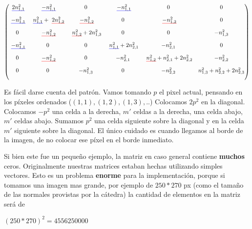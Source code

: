 \setul{5pt}{2pt}
\[
\begin{pmatrix}
    \text{\setulcolor{blue} \ul{$2 n_{1,1}^{2}$}}  &  \text{\setulcolor{blue} \ul{$ -n_{1,1}^{2} $}}   &  0        & \text{\setulcolor{blue} \ul{$-n_{1,1}^{2} $}}   & 0         & 0            \\[10pt]

    \text{\setulcolor{blue} \ul{$-n_{1,1}^{2}$}} &  \text{\setulcolor{blue} \ul{$n_{1,1}^{2}$}} +                                \text{\setulcolor{red} \ul{$2 n_{1,2}^{2}$}}   &  \text{\setulcolor{red} \ul{$-n_{1,2}^{2}$}}        & 0     & \text{\setulcolor{red} \ul{$-n_{1,2}^{2}$}}         & 0            \\[10pt]

    0          &  \text{\setulcolor{red} \ul{$-n_{1,2}^{2}$}}  &  \text{\setulcolor{red} \ul{$n_{1,2}^{2}$}} + 2 n_{1,3}^{2} &   0   & 0  & -n_{1,3}^{2}            \\[10pt]

    \text{\setulcolor{blue} \ul{$-n_{1,1}^{2}$}} &  0            &  0           & \text{\setulcolor{blue} \ul{$n_{1,1}^{2}$}} + 2 n_{2,1}^{2} & -n_{2,1}^{2}    & 0            \\[10pt]

    0          &   \text{\setulcolor{red} \ul{$-n_{1,2}^{2}$}} & 0           & -n_{2,1}^{2}                & \text{\setulcolor{red} \ul{$n_{1,2}^{2}$}} + n_{2,1}^{2} + 2 n_{2,2}^{2}    &      -n_{2,2}^{2}  \\[10pt]

    0          &              0&  -n_{1,3}^{2} & 0                          & - n_{2,2}^{2} & n_{1,3}^{2} + n_{2,2}^{2} + 2 n_{2,3}^{2}             \\[10pt]

\end{pmatrix}
\]

Es fácil darse cuenta del patrón. Vamos tomando $p$ el pixel actual, pensando en los píxeles ordenados ($(1,1), (1,2), (1,3), .. $) Colocamos $2p^2$ en la diagonal. Colocamos $-p^2$ una celda a la derecha, $m'$ celdas a la derecha, una celda abajo, $m'$ celdas abajo. Sumamos $p^2$ una celda siguiente sobre la diagonal y en la celda $m'$ siguiente sobre la diagonal. El único cuidado es cuando llegamos al borde de la imagen, de no colocar ese píxel en el borde inmediato.

Si bien este fue un pequeño ejemplo, la matriz en caso general contiene \textbf{muchos} ceros. Originalmente nuestras matrices estaban hechas utilizando simples vectores. Esto es un problema \textbf{enorme} para la implementación, porque si tomamos una imagen mas grande, por ejemplo de $250*270$ px (como el tamaño de las normales provistas por la cátedra) la cantidad de elementos en la matriz será de
\begin{center}
    $(250*270)^2 = 4 556 250 000$
\end{center}

